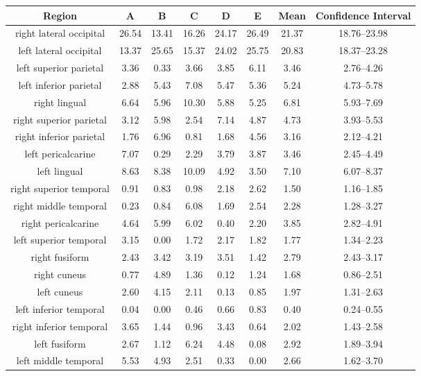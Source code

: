 
\begin{tabular}{cccccccc}
\toprule
Region & A & B & C & D & E  & Mean & Confidence Interval\\
\midrule
right lateral occipital & 26.54 & 13.41 & 16.26 & 24.17 & 26.49 & 21.37 & 18.76--23.98 \\
left lateral occipital & 13.37 & 25.65 & 15.37 & 24.02 & 25.75 & 20.83 & 18.37--23.28 \\
left superior parietal & 3.36 & 0.33 & 3.66 & 3.85 & 6.11 & 3.46 & 2.76--4.26 \\
left inferior parietal & 2.88 & 5.43 & 7.08 & 5.47 & 5.36 & 5.24 & 4.73--5.78 \\
right lingual & 6.64 & 5.96 & 10.30 & 5.88 & 5.25 & 6.81 & 5.93--7.69 \\
right superior parietal & 3.12 & 5.98 & 2.54 & 7.14 & 4.87 & 4.73 & 3.93--5.53 \\
right inferior parietal & 1.76 & 6.96 & 0.81 & 1.68 & 4.56 & 3.16 & 2.12--4.21 \\
left pericalcarine & 7.07 & 0.29 & 2.29 & 3.79 & 3.87 & 3.46 & 2.45--4.49 \\
left lingual & 8.63 & 8.38 & 10.09 & 4.92 & 3.50 & 7.10 & 6.07--8.37 \\
right superior temporal & 0.91 & 0.83 & 0.98 & 2.18 & 2.62 & 1.50 & 1.16--1.85 \\
right middle temporal & 0.23 & 0.84 & 6.08 & 1.69 & 2.54 & 2.28 & 1.28--3.27 \\
right pericalcarine & 4.64 & 5.99 & 6.02 & 0.40 & 2.20 & 3.85 & 2.82--4.91 \\
left superior temporal & 3.15 & 0.00 & 1.72 & 2.17 & 1.82 & 1.77 & 1.34--2.23 \\
right fusiform & 2.43 & 3.42 & 3.19 & 3.51 & 1.42 & 2.79 & 2.43--3.17 \\
right cuneus & 0.77 & 4.89 & 1.36 & 0.12 & 1.24 & 1.68 & 0.86--2.51 \\
left cuneus & 2.60 & 4.15 & 2.11 & 0.13 & 0.85 & 1.97 & 1.31--2.63 \\
left inferior temporal & 0.04 & 0.00 & 0.46 & 0.66 & 0.83 & 0.40 & 0.24--0.55 \\
right inferior temporal & 3.65 & 1.44 & 0.96 & 3.43 & 0.64 & 2.02 & 1.43--2.58 \\
left fusiform & 2.67 & 1.12 & 6.24 & 4.48 & 0.08 & 2.92 & 1.89--3.94 \\
left middle temporal & 5.53 & 4.93 & 2.51 & 0.33 & 0.00 & 2.66 & 1.62--3.70 \\
\bottomrule
\end{tabular}
